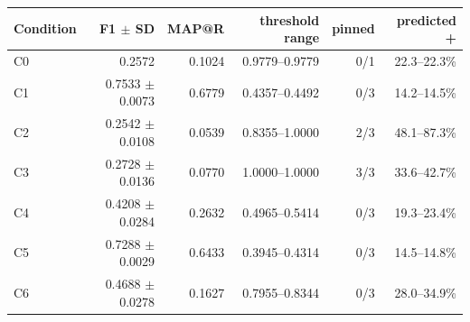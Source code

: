 \begin{tabular}{lrrrrr}
\toprule
Condition & F1 $\pm$ SD & MAP@R & threshold range & pinned & predicted + \\
\midrule
C0 & 0.2572 & 0.1024 & 0.9779--0.9779 & 0/1 & 22.3--22.3\% \\
C1 & 0.7533 $\pm$ 0.0073 & 0.6779 & 0.4357--0.4492 & 0/3 & 14.2--14.5\% \\
C2 & 0.2542 $\pm$ 0.0108 & 0.0539 & 0.8355--1.0000 & 2/3 & 48.1--87.3\% \\
C3 & 0.2728 $\pm$ 0.0136 & 0.0770 & 1.0000--1.0000 & 3/3 & 33.6--42.7\% \\
C4 & 0.4208 $\pm$ 0.0284 & 0.2632 & 0.4965--0.5414 & 0/3 & 19.3--23.4\% \\
C5 & 0.7288 $\pm$ 0.0029 & 0.6433 & 0.3945--0.4314 & 0/3 & 14.5--14.8\% \\
C6 & 0.4688 $\pm$ 0.0278 & 0.1627 & 0.7955--0.8344 & 0/3 & 28.0--34.9\% \\
\bottomrule
\end{tabular}
